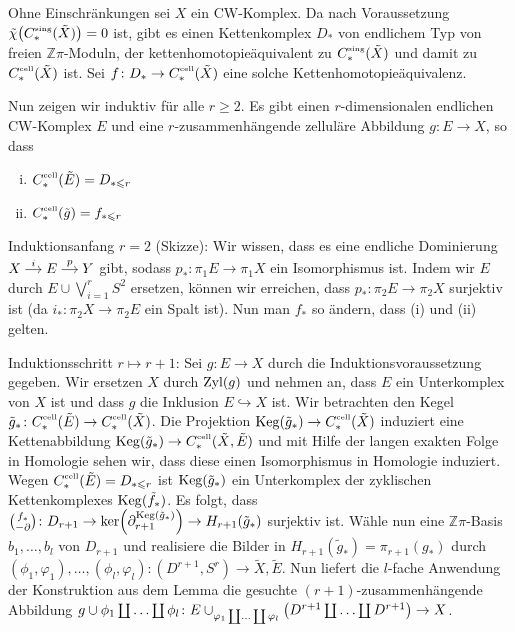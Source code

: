 \begin{beweis}[{name={zweite Richtung von \autoref{satz:wall}}}]
	Ohne Einschränkungen sei $X$ ein CW-Komplex.
	Da nach Voraussetzung $\tilde{\chi} \enbrace*{C^\sing_*(\tilde{X})}=0$ ist, gibt es einen Kettenkomplex $D_*$ von endlichem Typ von freien $\mathbb{Z}\pi$-Moduln, der kettenhomotopieäquivalent zu $C_*^\sing(\tilde{X})$ und damit zu $C^\cell_*(\tilde{X})$ ist.
	Sei $f \colon D_* \to C_*^\cell(\tilde{X})$ eine solche Kettenhomotopieäquivalenz.
	
	Nun zeigen wir induktiv für alle $r \ge 2$.
	Es gibt einen $r$-dimensionalen endlichen CW-Komplex $E$ und eine $r$-zusammenhängende zelluläre Abbildung $g \colon E \to X$, so dass 
	\begin{enumerate}[(i)]
		\item $C_*^\cell(\tilde{E}) = D_{* \le r}$
		\item $C_*^\cell(\tilde{g}) = f_{* \le r}$
	\end{enumerate}
	Induktionsanfang $r=2$ (Skizze): Wir wissen, dass es eine endliche Dominierung $\begin{tikzcd}[cramped,sep=small] X \rar["i"] & E \rar["p"] & Y \end{tikzcd}$ gibt, sodass $p_* \colon \pi_1 E \to \pi_1 X$ ein Isomorphismus ist.
	Indem wir $E$ durch $E \cup \bigvee_{i=1}^r S^2$ ersetzen, können wir erreichen, dass $p_* \colon \pi_2 E \to \pi_2 X$ surjektiv ist (da $i_* \colon \pi_2 X \to \pi_2 E$ ein Spalt ist).
	Nun man $f_*$ so ändern, dass (i) und (ii) gelten.
	
	Induktionsschritt $r \mapsto r+1$: Sei $g \colon E \to X$ durch die Induktionsvoraussetzung gegeben.
	Wir ersetzen $X$ durch $\Zyl(g)$ und nehmen an, dass $E$ ein Unterkomplex von $X$ ist und dass $g$ die Inklusion $E\hookrightarrow X$ ist.
	Wir betrachten den Kegel $\tilde{g}_* \colon C^\cell_*(\tilde{E}) \to C^\cell_*(\tilde{X})$.
	Die Projektion $\Keg(\tilde{g}_*) \to C^\cell_*(\tilde{X})$ induziert eine Kettenabbildung $\Keg(\tilde{g}_*) \to C^\cell_*(\tilde{X},\tilde{E})$ und mit Hilfe der langen exakten Folge in Homologie sehen wir, dass diese einen Isomorphismus in Homologie induziert.
	Wegen $C^\cell_*(\tilde{E}) = D_{* \le r}$ ist $\Keg(\tilde{g}_*)$ ein Unterkomplex der zyklischen Kettenkomplexes $\Keg(\tilde{f}_*)$.
	Es folgt, dass $\binom{f_*}{-\partial}\colon D_{r+1} \to \ker \enbrace*{\partial_{r+1}^{\Keg(\tilde{g}_*)}} \to H_{r+1}(\tilde{g}_*)$ surjektiv ist.
	Wähle nun eine $\mathbb{Z}\pi$-Basis $b_1, \ldots ,b_l$ von $D_{r+1}$ und realisiere die Bilder in $H_{r+1}(\tilde{g}_*)=\pi_{r+1}(g_*)$ durch  $(\phi_1,\varphi_1), \ldots , (\phi_l,\varphi_l) \colon (D^{r+1},S^r) \to \tilde{X},\tilde{E}$.
	Nun liefert die $l$-fache Anwendung der Konstruktion aus dem Lemma die gesuchte $(r+1)$-zusammenhängende Abbildung $g \cup \phi_1 \coprod \ldots \coprod \phi_l \colon E \cup_{\varphi_1 \coprod \ldots \coprod \varphi_l} \enbrace*{D^{r+1} \coprod \ldots \coprod D^{r+1}} \to X$.
\end{beweis}

